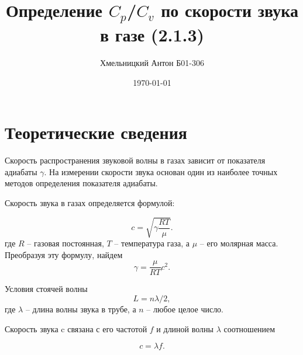 \documentclass[a4paper, 12pt]{article}
\title{Определение $C_p$/$C_v$ по скорости звука в газе (2.1.3)}
\author{Хмельницкий Антон Б01-306}
\date{\today}
\begin{document}
    \maketitle
    \section{Теоретические сведения}
	
	Скорость распространения звуковой волны в газах зависит от показателя адиабаты $\gamma $. На измерении скорости звука основан один из наиболее точных методов определения показателя адиабаты.
	
	Скорость звука в газах определяется формулой:
	
	\begin{equation}
		c=\sqrt{\gamma\frac{RT}{\mu}}.
		\label{velocity}
	\end{equation}
	где $ R $ -- газовая постоянная, $ T $ -- температура газа, а $ \mu $ -- его молярная масса. Преобразуя эту формулу, найдем
	\begin{equation}\label{gamma}
		\gamma = \frac{\mu}{RT}c^2.
	\end{equation}

    Условия стоячей волны
    \[ L=n\lambda/2, \] где $ \lambda $ -- длина волны звука в трубе, а $ n $ -- любое целое число.
	
	Скорость звука c связана с его частотой $ f $ и длиной волны $ \lambda $ соотношением
	
	\begin{equation}\label{lambda_f}
		c=\lambda f.
	\end{equation}
	
\end{document}
